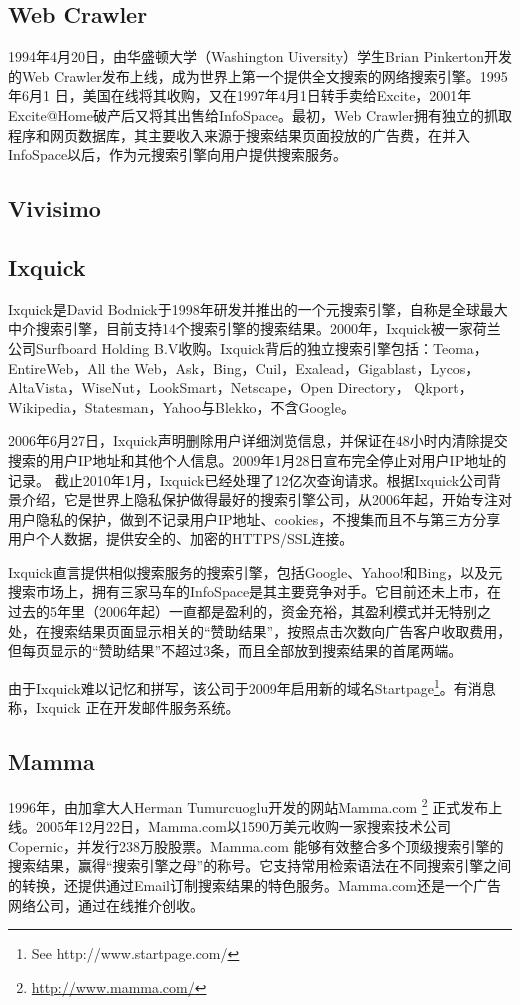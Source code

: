 \subsection{Web Crawler}
1994年4月20日，由华盛顿大学（Washington Uiversity）学生Brian Pinkerton开发的Web Crawler发布上线，成为世界上第一个提供全文搜索的网络搜索引擎。1995 年6月1 日，美国在线将其收购，又在1997年4月1日转手卖给Excite，2001年Excite@Home破产后又将其出售给InfoSpace。最初，Web Crawler拥有独立的抓取程序和网页数据库，其主要收入来源于搜索结果页面投放的广告费，在并入InfoSpace以后，作为元搜索引擎向用户提供搜索服务。

\subsection{Vivisimo}


\subsection{Ixquick}
Ixquick是David Bodnick于1998年研发并推出的一个元搜索引擎，自称是全球最大中介搜索引擎，目前支持14个搜索引擎的搜索结果。2000年，Ixquick被一家荷兰公司Surfboard Holding B.V收购。Ixquick背后的独立搜索引擎包括：Teoma，EntireWeb，All the Web，Ask，Bing，Cuil，Exalead，Gigablast，Lycos，AltaVista，WiseNut，LookSmart，Netscape，Open Directory， Qkport， Wikipedia，Statesman，Yahoo与Blekko，不含Google。

2006年6月27日，Ixquick声明删除用户详细浏览信息，并保证在48小时内清除提交搜索的用户IP地址和其他个人信息。2009年1月28日宣布完全停止对用户IP地址的记录。
截止2010年1月，Ixquick已经处理了12亿次查询请求。根据Ixquick公司背景介绍，它是世界上隐私保护做得最好的搜索引擎公司，从2006年起，开始专注对用户隐私的保护，做到不记录用户IP地址、cookies，不搜集而且不与第三方分享用户个人数据，提供安全的、加密的HTTPS/SSL连接。

Ixquick直言提供相似搜索服务的搜索引擎，包括Google、Yahoo!和Bing，以及元搜索市场上，拥有三家马车的InfoSpace是其主要竞争对手。它目前还未上市，在过去的5年里（2006年起）一直都是盈利的，资金充裕，其盈利模式并无特别之处，在搜索结果页面显示相关的“赞助结果”，按照点击次数向广告客户收取费用，但每页显示的“赞助结果”不超过3条，而且全部放到搜索结果的首尾两端。

由于Ixquick难以记忆和拼写，该公司于2009年启用新的域名Startpage\footnote{See http://www.startpage.com/}。有消息称，Ixquick 正在开发邮件服务系统。
\subsection{Mamma}
1996年，由加拿大人Herman Tumurcuoglu开发的网站Mamma.com
\footnote{\href{http://www.mamma.com/}{http://www.mamma.com/}}
正式发布上线。2005年12月22日，Mamma.com以1590万美元收购一家搜索技术公司Copernic，并发行238万股股票。Mamma.com 能够有效整合多个顶级搜索引擎的搜索结果，赢得“搜索引擎之母”的称号。它支持常用检索语法在不同搜索引擎之间的转换，还提供通过Email订制搜索结果的特色服务。Mamma.com还是一个广告网络公司，通过在线推介创收。

